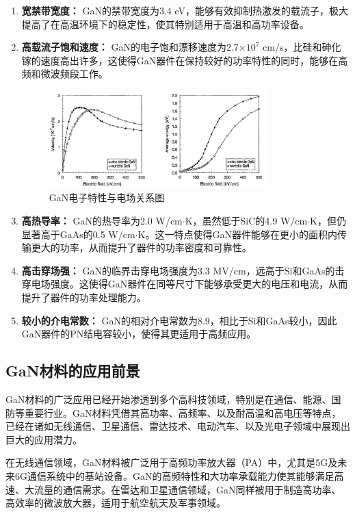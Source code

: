 \documentclass[12pt,hyperref,a4paper,UTF8]{ctexart}
\begin{document}
\begin{enumerate}
  \item \textbf{宽禁带宽度：} GaN的禁带宽度为3.4 eV，能够有效抑制热激发的载流子，极大提高了在高温环境下的稳定性，使其特别适用于高温和高功率设备。
  \item \textbf{高载流子饱和速度：} GaN的电子饱和漂移速度为2.7$\times 10^7$ cm/s，比硅和砷化镓的速度高出许多，这使得GaN器件在保持较好的功率特性的同时，能够在高频和微波频段工作。
\begin{figure}[H]
\centering
\includegraphics[width=0.8\textwidth]{figures/fig/image1.png}
\caption{GaN电子特性与电场关系图\cite{kolnik1995electronic}}
\label{fig:GaN electron}
\end{figure}

  \item \textbf{高热导率：} GaN的热导率为2.0 W/cm$\cdot$K，虽然低于SiC的4.9 W/cm$\cdot$K，但仍显著高于GaAs的0.5 W/cm$\cdot$K。这一特点使得GaN器件能够在更小的面积内传输更大的功率，从而提升了器件的功率密度和可靠性。
  \item \textbf{高击穿场强：} GaN的临界击穿电场强度为3.3 MV/cm，远高于Si和GaAs的击穿电场强度。这使得GaN器件在同等尺寸下能够承受更大的电压和电流，从而提升了器件的功率处理能力。
  \item \textbf{较小的介电常数：} GaN的相对介电常数为8.9，相比于Si和GaAs较小，因此GaN器件的PN结电容较小，使得其更适用于高频应用。
\end{enumerate}

\subsection{GaN材料的应用前景}

GaN材料的广泛应用已经开始渗透到多个高科技领域，特别是在通信、能源、国防等重要行业。GaN材料凭借其高功率、高频率、以及耐高温和高电压等特点，已经在诸如无线通信、卫星通信、雷达技术、电动汽车、以及光电子领域中展现出巨大的应用潜力。

在无线通信领域，GaN材料被广泛用于高频功率放大器（PA）中，尤其是5G及未来6G通信系统中的基站设备。GaN的高频特性和大功率承载能力使其能够满足高速、大流量的通信需求。在雷达和卫星通信领域，GaN同样被用于制造高功率、高效率的微波放大器，适用于航空航天及军事领域。
\end{document}
